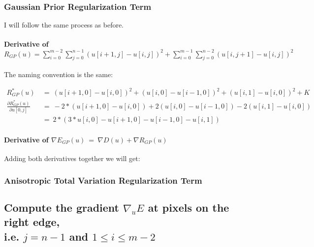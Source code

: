 \documentclass{report}
\begin{document}
			\subsubsection{Gaussian Prior Regularization Term}
			\startsubsection
				I will follow the same process as before.
				\vspace{-0.4cm} \paragraph{Derivative of $R_{GP}(u) = \sum_{i=0}^{m-2} \sum_{j=0}^{n-1} ( u[i+1,j] - u[i,j] )^2 + \sum_{i=0}^{m-1} \sum_{j=0}^{n-2} ( u[i,j+1] - u[i,j] )^2$}
				\startsubsection
					\vspace{0.2cm} The naming convention is the same:
				\closesection
				\begin{adjustwidth}{-4em}{}
					\vspace{-0.5cm}
					\begin{align*}
						R_{GP}^*(u) \ & = \ (u[i+1,0] - u[i,0])^2 + (u[i,0] - u[i-1,0])^2 + (u[i,1] - u[i,0])^2 + K \\
						\frac{\partial R_{GP}^*(u)}{\partial u[0,j]} \ & = \ -2 * (u[i+1,0] - u[i,0]) + 2 (u[i,0] - u[i-1,0]) - 2 (u[i,1] - u[i,0]) \\
						& = \ 2 * (3 * u[i,0] - u[i+1,0] - u[i-1,0] - u[i,1])
					\end{align*}
				\end{adjustwidth}
				\vspace{-0.4cm} \paragraph{Derivative of $\nabla E_{GP}(u) \ = \ \nabla D(u) + \nabla R_{GP}(u)$}
				\startsubsection
					Adding both derivatives together we will get:
				\closesection
			\closesection
			\subsubsection{Anisotropic Total Variation Regularization Term}
			\startsubsection
			\closesection
		\closesection
		
		\subsection{Compute the gradient $\nabla_u E$ at pixels on the right edge, \\ i.e. $j = n - 1$ and $1 \leq i \leq m-2$}
		\startsubsection
\end{document}
